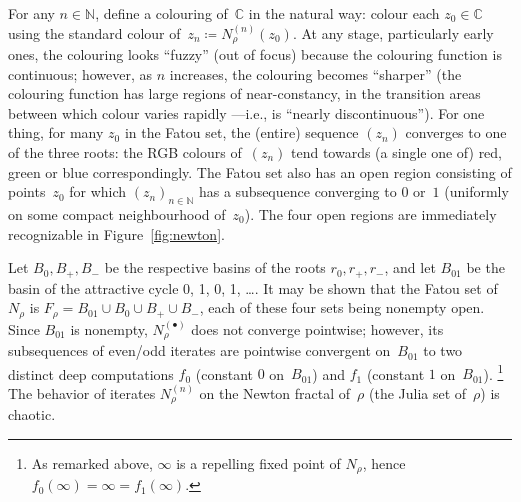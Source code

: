 For any $n\in \mathbb{N}$, define a colouring of~$\mathbb{C}$ in the natural way:
colour each $z_0\in \mathbb{C}$ using the standard colour of~$z_n\coloneqq N_{\rho}^{(n)}(z_0)$.
At any stage, particularly early ones, the colouring looks “fuzzy” (out of focus) because the colouring function is continuous;
however, as $n$ increases, the colouring becomes “sharper”
(the colouring function has large regions of near-constancy, in the transition areas between which colour varies rapidly —i.e., is “nearly discontinuous”).
For one thing, for many $z_0$ in the Fatou set, the (entire) sequence $(z_n)$ converges to one of the three roots:
the RGB colours of~$(z_n)$ tend towards (a single one of) red, green or blue correspondingly.
The Fatou set also has an open region consisting of points~$z_0$ for which $(z_n)_{n\in \mathbb{N}}$ has a subsequence converging to $0$ or~$1$ (uniformly on some compact neighbourhood of~$z_0$).
The four open regions are immediately recognizable in Figure~\ref{fig:newton}.

Let $B_0, B_+, B_-$ be the respective basins of the roots $r_0, r_+, r_-$, and let $B_{01}$ be the basin of the attractive cycle 0, 1, 0, 1, \dots.
It may be shown that the Fatou set of $N_\rho$ is $F_\rho = B_{01} \cup B_0 \cup B_{+} \cup B_{-}$, each of these four sets being nonempty open.
Since $B_{01}$ is nonempty, $N_\rho^{(\bullet)}$ does not converge pointwise; however, its subsequences of even/odd iterates are pointwise convergent on~$B_{01}$ to two distinct deep computations $f_0$ (constant $0$ on~$B_{01}$) and $f_1$ (constant $1$ on~$B_{01}$). \footnote{As remarked above, $\infty$ is a repelling fixed point of $N_\rho$, hence $f_0(\infty) = \infty = f_1(\infty)$.}
The behavior of iterates $N^{(n)}_\rho$ on the Newton fractal of~$\rho$ (the Julia set of~$\rho$) is chaotic.

